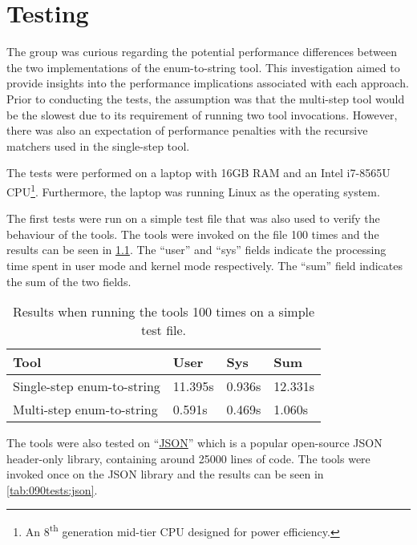 \chapter{Testing}\label{chp:090:tests}
The group was curious regarding the potential performance differences between the two implementations of the enum-to-string tool.
This investigation aimed to provide insights into the performance implications associated with each approach.
Prior to conducting the tests, the assumption was that the multi-step tool would be the slowest due to its requirement of running two tool invocations.
However, there was also an expectation of performance penalties with the recursive matchers used in the single-step tool.

The tests were performed on a laptop with 16GB RAM and an Intel i7-8565U CPU\footnote{
    An 8\textsuperscript{th} generation mid-tier CPU designed for power efficiency.
}. Furthermore, the laptop was running Linux as the operating system.

The first tests were run on a simple test file that was also used to verify the behaviour of the tools. The tools were invoked on the file 100 times and the results can be seen in \cref{tab:090tests:simple}. The ``user'' and ``sys'' fields indicate the processing time spent in user mode and kernel mode respectively. The ``sum'' field indicates the sum of the two fields.

\begin{table}[H]
    \centering
    \begin{tabular}{|p{}|p{}|p{}|p{}|}
    \hline
    \rowcolor{gray!30}
    \textbf{Tool} & \textbf{User} & \textbf{Sys} & \textbf{Sum} \\ \hline
    Single-step enum-to-string & 11.395s & 0.936s & 12.331s \\ \hline
    Multi-step enum-to-string & 0.591s & 0.469s & 1.060s \\ \hline
    \end{tabular}
    \caption{Results when running the tools 100 times on a simple test file.}
    \label{tab:090tests:simple}
\end{table}
\vspace*{-1em}

The tools were also tested on ``\href{https://github.com/nlohmann/json}{JSON}'' which is a popular open-source JSON header-only library, containing around 25000 lines of code.
The tools were invoked once on the JSON library and the results can be seen in \cref{tab:090tests:json}.

